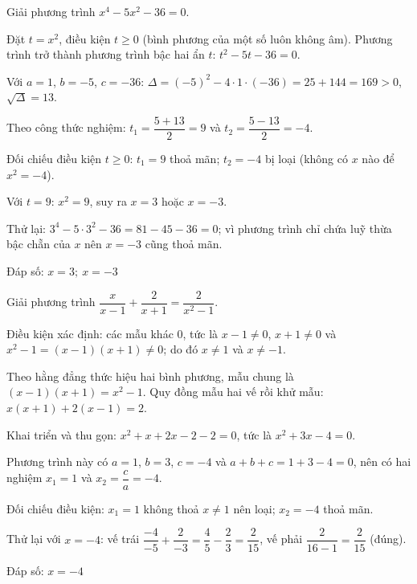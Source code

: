 \begin{problem}[9DS-PT2-014]
Giải phương trình $x^4 - 5x^2 - 36 = 0$.

\begin{solution}
Đặt $t = x^2$, điều kiện $t \geq 0$ (bình phương của một số luôn không âm). Phương trình trở thành phương trình bậc hai ẩn $t$: $t^2 - 5t - 36 = 0$.

Với $a = 1$, $b = -5$, $c = -36$: $\Delta = (-5)^2 - 4 \cdot 1 \cdot (-36) = 25 + 144 = 169 > 0$, $\sqrt{\Delta} = 13$.

Theo công thức nghiệm: $t_1 = \dfrac{5 + 13}{2} = 9$ và $t_2 = \dfrac{5 - 13}{2} = -4$.

Đối chiếu điều kiện $t \geq 0$: $t_1 = 9$ thoả mãn; $t_2 = -4$ bị loại (không có $x$ nào để $x^2 = -4$).

Với $t = 9$: $x^2 = 9$, suy ra $x = 3$ hoặc $x = -3$.

Thử lại: $3^4 - 5 \cdot 3^2 - 36 = 81 - 45 - 36 = 0$; vì phương trình chỉ chứa luỹ thừa bậc chẵn của $x$ nên $x = -3$ cũng thoả mãn.

Đáp số: $\boxed{x = 3;\ x = -3}$
\end{solution}
\end{problem}

\begin{problem}[9DS-PT2-015]
Giải phương trình $\dfrac{x}{x - 1} + \dfrac{2}{x + 1} = \dfrac{2}{x^2 - 1}$.

\begin{solution}
Điều kiện xác định: các mẫu khác $0$, tức là $x - 1 \neq 0$, $x + 1 \neq 0$ và $x^2 - 1 = (x - 1)(x + 1) \neq 0$; do đó $x \neq 1$ và $x \neq -1$.

Theo hằng đẳng thức hiệu hai bình phương, mẫu chung là $(x - 1)(x + 1) = x^2 - 1$. Quy đồng mẫu hai vế rồi khử mẫu: $x(x + 1) + 2(x - 1) = 2$.

Khai triển và thu gọn: $x^2 + x + 2x - 2 - 2 = 0$, tức là $x^2 + 3x - 4 = 0$.

Phương trình này có $a = 1$, $b = 3$, $c = -4$ và $a + b + c = 1 + 3 - 4 = 0$, nên có hai nghiệm $x_1 = 1$ và $x_2 = \dfrac{c}{a} = -4$.

Đối chiếu điều kiện: $x_1 = 1$ không thoả $x \neq 1$ nên loại; $x_2 = -4$ thoả mãn.

Thử lại với $x = -4$: vế trái $\dfrac{-4}{-5} + \dfrac{2}{-3} = \dfrac{4}{5} - \dfrac{2}{3} = \dfrac{2}{15}$, vế phải $\dfrac{2}{16 - 1} = \dfrac{2}{15}$ (đúng).

Đáp số: $\boxed{x = -4}$
\end{solution}
\end{problem}

